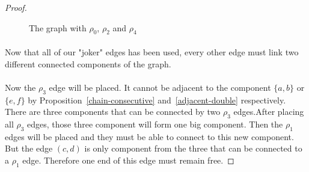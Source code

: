 \begin{proof}
\begin{figure}[H]
  \begin{center}
    \caption{The graph with $\rho_0$, $\rho_2$ and $\rho_4$}
  \end{center}
\end{figure}

\paragraph{}
Now that all of our "joker" edges has been used, every other edge must link two different connected components of the graph.

\paragraph{}
Now the $\rho_3$ edge will be placed. It cannot be adjacent to the component $\{a,b\}$ or $\{e,f\}$ by Proposition~\ref{chain-consecutive} and~\ref{adjacent-double} respectively. There are three components that can be connected by two $\rho_3$ edges.After placing all $\rho_3$ edges, those three component will form one big component. Then the $\rho_1$ edges will be placed and they must be able to connect to this new component. But the edge $(c,d)$ is only component from the three that can be connected to a $\rho_1$ edge. Therefore one end of this edge must remain free.


\end{proof}
